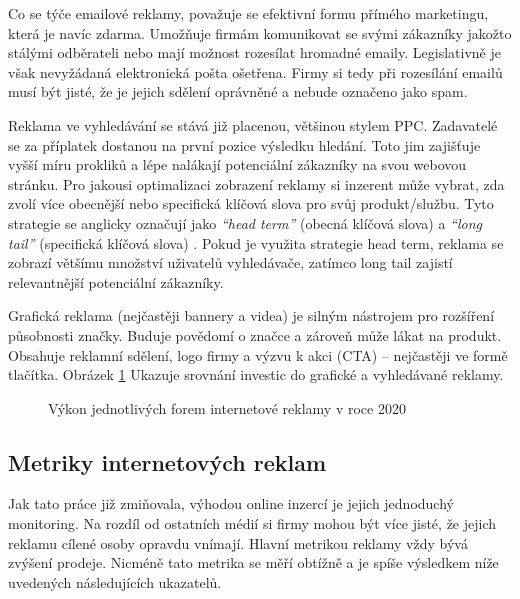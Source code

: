 Co se týče emailové reklamy, považuje se efektivní formu přímého marketingu, která je navíc zdarma.
Umožňuje firmám komunikovat se svými zákazníky jakožto stálými odběrateli nebo mají možnost rozesílat hromadné emaily. Legislativně je však nevyžádaná elektronická pošta ošetřena.
Firmy si tedy při rozesílání emailů musí být jisté, že je jejich sdělení oprávněné a nebude označeno jako spam.

Reklama ve vyhledávání se stává již placenou, většinou stylem PPC. Zadavatelé se za příplatek dostanou na první pozice výsledku hledání.
Toto jim zajišťuje vyšší míru prokliků a lépe nalákají potenciální zákazníky na svou webovou stránku.
Pro jakousi optimalizaci zobrazení reklamy si inzerent může vybrat, zda zvolí více obecnější nebo specifická klíčová slova pro svůj produkt/službu. Tyto strategie se anglicky označují
jako \emph{\enquote{head term}} (obecná klíčová slova) a \emph{\enquote{long tail}} (specifická klíčová slova) \cite{ads:long-tail}.
Pokud je využita strategie head term, reklama se zobrazí většímu množství
uživatelů vyhledávače, zatímco long tail zajistí relevantnější potenciální zákazníky.

Grafická reklama (nejčastěji bannery a videa) je silným nástrojem pro rozšíření působnosti značky. Buduje povědomí o značce a
zároveň může lákat na produkt. Obsahuje reklamní sdělení, logo firmy a výzvu k akci (CTA) -- nejčastěji ve formě tlačítka.
Obrázek \ref{fig:spir-ad-performance} Ukazuje srovnání investic do grafické a vyhledávané reklamy.

\begin{figure}[h]
    \centering
    \caption[Výkon reklam v roce 2020]{Výkon jednotlivých forem internetové reklamy v roce 2020 \cite{spir:mediatypes}}
    \label{fig:spir-ad-performance}
\end{figure}

    \subsection{Metriky internetových reklam}\label{ssec:online-ad-metrics}
    Jak tato práce již zmiňovala, výhodou online inzercí je jejich jednoduchý monitoring. Na rozdíl od ostatních médií si firmy mohou být více jisté,
    že jejich reklamu cílené osoby opravdu vnímají. Hlavní metrikou reklamy vždy bývá zvýšení prodeje.
    Nicméně tato metrika se měří obtížně a je spíše výsledkem níže uvedených následujících ukazatelů.

